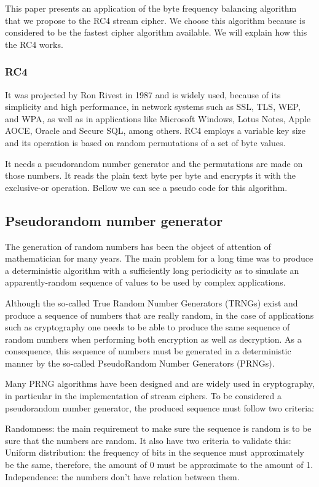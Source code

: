 \documentclass{llncs}
\begin{document}
This paper presents an application of the byte frequency balancing algorithm that we propose to the RC4 stream cipher. We choose this algorithm because is considered to be the fastest cipher algorithm available. We will explain how this the RC4 works.
%
\subsubsection{RC4}
It was projected by Ron Rivest in 1987 and is widely used, because of its simplicity and high performance, in network systems such as SSL, TLS, WEP, and WPA, as well as in applications like Microsoft Windows, Lotus Notes, Apple AOCE, Oracle and Secure SQL, among others. RC4 employs a variable key size and its operation is based on random permutations of a set of byte values.

It needs a pseudorandom number generator and the permutations are made on those numbers. It reads the plain text byte per byte and encrypts it with the exclusive-or operation. Bellow we can see a pseudo code for this algorithm.

\subsection{Pseudorandom number generator}
The generation of random numbers has been the object of attention of mathematician for many years. The main problem for a long time was to produce a deterministic algorithm with a sufficiently long periodicity as to simulate an apparently-random sequence of values to be used by complex applications.

Although the so-called True Random Number Generators (TRNGs)  exist and produce a sequence of numbers that are really random, in the case of applications such as cryptography one needs to be able to produce the same sequence of random numbers when performing both encryption as well as decryption. As a consequence, this sequence of numbers must be generated in a deterministic manner by the so-called PseudoRandom Number Generators (PRNGs).

Many PRNG algorithms have been designed and are widely used in cryptography, in particular in the implementation of stream ciphers. To be considered a pseudorandom number generator, the produced sequence must follow two criteria: 

Randomness: the main requirement to make sure the sequence is random is to be sure that the numbers are random. It also have two criteria to validate this:
	Uniform distribution: the frequency of bits in the sequence must approximately be the same, therefore, the amount of 0 must be approximate to the amount of 1.
	Independence: the numbers don't have relation between them.
\end{document}
